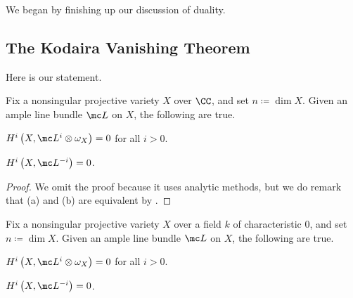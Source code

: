\documentclass[../notes.tex]{subfiles}
\begin{document}
We began by finishing up our discussion of duality.

\subsection{The Kodaira Vanishing Theorem}
Here is our statement.
\begin{theorem} \label{thm:kodaira-c}
	Fix a nonsingular projective variety $X$ over $\CC$, and set $n\coloneqq\dim X$. Given an ample line bundle $\mc L$ on $X$, the following are true.
	\begin{listalph}
		\item $H^i\left(X,\mc L^i\otimes\omega_X\right)=0$ for all $i>0$.
		\item $H^i\left(X,\mc L^{-i}\right)=0$.
	\end{listalph}
\end{theorem}
\begin{proof}
	We omit the proof because it uses analytic methods, but we do remark that (a) and (b) are equivalent by .
\end{proof}
\begin{corollary}
	Fix a nonsingular projective variety $X$ over a field $k$ of characteristic $0$, and set $n\coloneqq\dim X$. Given an ample line bundle $\mc L$ on $X$, the following are true.
	\begin{listalph}
		\item $H^i\left(X,\mc L^i\otimes\omega_X\right)=0$ for all $i>0$.
		\item $H^i\left(X,\mc L^{-i}\right)=0$.
	\end{listalph}
\end{corollary}
\end{document}

